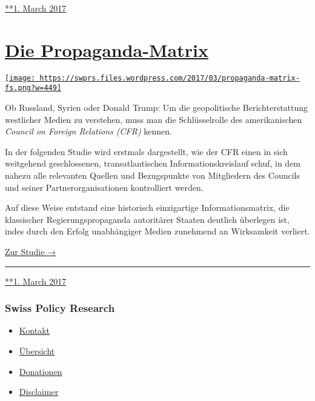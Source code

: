 \href{https://swprs.org/2017/03/01/medienqualitaet/}{**1. March 2017}

\hypertarget{die-propaganda-matrix}{%
\section{\texorpdfstring{\href{https://swprs.org/2017/03/01/propaganda-matrix/}{Die
Propaganda-Matrix}}{Die Propaganda-Matrix}}\label{die-propaganda-matrix}}

\href{https://swprs.org/2017/03/01/propaganda-matrix/}{\texttt{[image: https://swprs.files.wordpress.com/2017/03/propaganda-matrix-fs.png?w=449]}}

Ob Russland, Syrien oder Donald Trump: Um die geopolitische
Bericht­erstattung westlicher Medien zu verstehen, muss man die
Schlüssel­rolle des amerikanischen \emph{Council on Foreign Relations
(CFR)} kennen.

In der folgenden Studie wird erstmals dargestellt, wie der CFR einen in
sich weitgehend geschlossenen, trans­atlantischen
Informations­­kreislauf schuf, in dem nahezu alle relevanten Quellen und
Bezugs­punkte von Mitgliedern des Councils und seiner
Partner­­organisationen kontrolliert werden.

Auf diese Weise entstand eine historisch einzigartige
Informations­­matrix, die klassischer Regierungs­propaganda autoritärer
Staaten deutlich überlegen ist, indes durch den Erfolg unabhängiger
Medien zunehmend an Wirksamkeit verliert.

\href{https://swprs.org/die-propaganda-matrix}{Zur Studie →}

\begin{center}\rule{0.5\linewidth}{\linethickness}\end{center}

\href{https://swprs.org/2017/03/01/propaganda-matrix/}{**1. March 2017}

\hypertarget{swiss-policy-research}{%
\subsubsection{Swiss Policy Research}\label{swiss-policy-research}}

\begin{itemize}
\tightlist
\item
  \href{https://swprs.org/kontakt/}{Kontakt}
\item
  \href{https://swprs.org/uebersicht/}{Übersicht}
\item
  \href{https://swprs.org/donationen/}{Donationen}
\item
  \href{https://swprs.org/disclaimer/}{Disclaimer}
\end{itemize}

